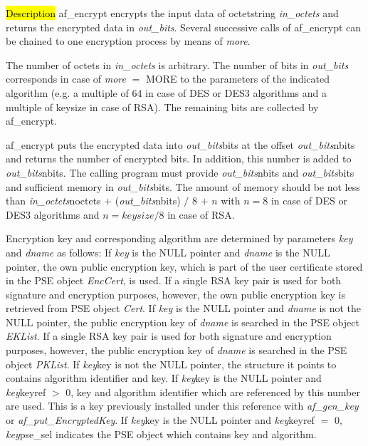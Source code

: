 


\hl{Description}
af\_encrypt encrypts the input data of octetstring {\em in\_octets} and returns the encrypted data
in {\em out\_bits}. Several successive calls of af\_encrypt can be chained
to one encryption process by means of {\em more}.

The number of octets in {\em in\_octets} is arbitrary. The number of bits in {\em out\_bits}
corresponds in case of {\em more} $=$ MORE to the parameters of the indicated algorithm
(e.g. a multiple of 64 in case of DES or DES3 algorithms and a multiple of keysize
in case of RSA). The remaining bits are collected by af\_encrypt.

af\_encrypt puts the encrypted data into {\em out\_bits}\pf bits at the offset
{\em out\_bits}\pf nbits and returns the number of encrypted bits. In addition, this number is added 
to {\em out\_bits}\pf nbits.
The calling program must provide {\em out\_bits}\pf nbits and {\em out\_bits}\pf bits and sufficient
memory in {\em out\_bits}\pf bits.
The amount of memory should be not less than
{\em in\_octets}\pf noctets $+$ ({\em out\_bits}\pf nbits) $/$ 8 $+$ $n$ with $n = 8$ 
in case of DES or DES3 algorithms and $n = keysize / 8$ in case of RSA.

Encryption key and corresponding algorithm are determined by parameters {\em key} and {\em dname} as follows:
\be
\m If {\em key} is the NULL pointer and {\em dname} is the NULL pointer,
   the own public encryption key, which is part of the user certificate stored in the PSE object
   {\em EncCert}, is used.
   If a single RSA key pair is used for both signature and encryption purposes, however, the own public encryption key
   is retrieved from PSE object {\em Cert}.
\m If {\em key} is the NULL pointer and {\em dname} is not the NULL pointer,
   the public encryption key of {\em dname} is searched in the PSE object {\em EKList}.
   If a single RSA key pair is used for both signature and encryption purposes, however, the public encryption key of 
   {\em dname} is searched in the PSE object {\em PKList}.
\m If {\em key}\pf key is not the NULL pointer, the structure it points to
   contains algorithm identifier and key.
\m If {\em key}\pf key is the NULL pointer and {\em key}\pf keyref $>$ 0,
   key and algorithm identifier which are referenced by this number are used. This is a key
   previously installed under this reference with {\em af\_gen\_key} or 
   {\em af\_put\_EncryptedKey}.
\m If {\em key}\pf key is the NULL pointer and {\em key}\pf keyref $=$ 0,
   {\em key}\pf pse\_sel indicates the PSE object which contains key and algorithm.
\ee

